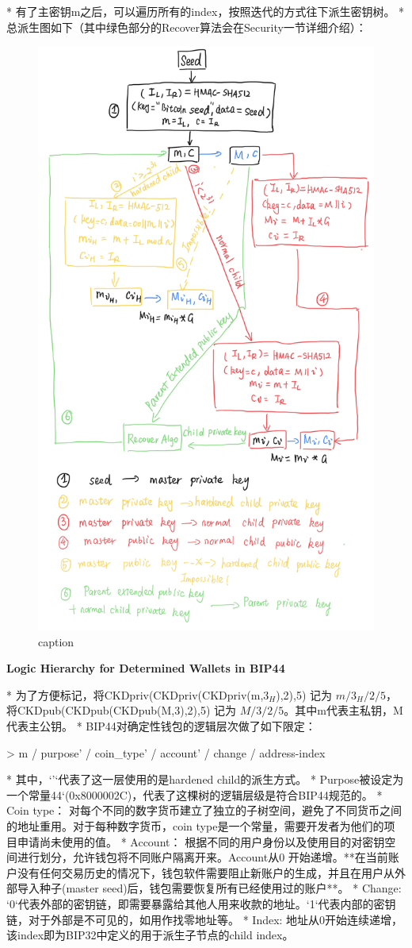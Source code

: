 \documentclass{article}
\begin{document}
* 有了主密钥m之后，可以遍历所有的index，按照迭代的方式往下派生密钥树。
* 总派生图如下（其中绿色部分的Recover算法会在Security一节详细介绍）：

\begin{figure}[h]
\centering
\includegraphics[width=.7\textwidth]{./outline.png}
\caption{caption}\label{fig-parsesig}
\end{figure}

\textbf{Logic Hierarchy for Determined Wallets in BIP44}

* 为了方便标记，将CKDpriv(CKDpriv(CKDpriv(m,$3_H$),2),5) 记为 $m/3_H/2/5$，将CKDpub(CKDpub(CKDpub(M,3),2),5) 记为 $M/3/2/5$。其中m代表主私钥，M代表主公钥。
* BIP44对确定性钱包的逻辑层次做了如下限定：

> m / purpose' / coin_type' / account' / change / address-index

* 其中，`'`代表了这一层使用的是hardened child的派生方式。
* Purpose被设定为一个常量44‘(0x8000002C)，代表了这棵树的逻辑层级是符合BIP44规范的。
* Coin type： 对每个不同的数字货币建立了独立的子树空间，避免了不同货币之间的地址重用。对于每种数字货币，coin type是一个常量，需要开发者为他们的项目申请尚未使用的值。
* Account： 根据不同的用户身份以及使用目的对密钥空间进行划分，允许钱包将不同账户隔离开来。Account从0 开始递增。**在当前账户没有任何交易历史的情况下，钱包软件需要阻止新账户的生成，并且在用户从外部导入种子(master seed)后，钱包需要恢复所有已经使用过的账户**。
* Change: `0`代表外部的密钥链，即需要暴露给其他人用来收款的地址。`1`代表内部的密钥链，对于外部是不可见的，如用作找零地址等。
* Index: 地址从0开始连续递增，该index即为BIP32中定义的用于派生子节点的child index。
\end{document}
